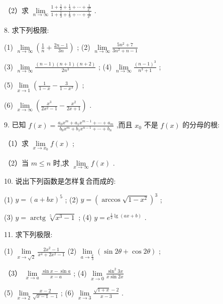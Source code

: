 \documentclass[lang=cn,newtx,10pt,scheme=chinese]{elegantbook}
\begin{document}
（2）求 \(\mathop{\lim }\limits_{{n \rightarrow \infty }}\frac{1 + \frac{1}{2} + \frac{1}{4} + \cdots + \frac{1}{{2}^{n}}}{1 + \frac{1}{3} + \frac{1}{9} + \cdots + \frac{1}{{3}^{n}}}\) .

8. 求下列极限:

(1) \(\mathop{\lim }\limits_{{n \rightarrow \infty }}\left( {\frac{1}{n} + \frac{{2n} - 1}{3n}}\right)\) ; (2) \(\mathop{\lim }\limits_{{n \rightarrow \infty }}\frac{5{n}^{2} + 7}{3{n}^{2} + n - 1}\)

(3) \(\mathop{\lim }\limits_{{n \rightarrow \infty }}\frac{\left( {n - 1}\right) \left( {n + 1}\right) \left( {n + 2}\right) }{2{n}^{3}}\) ; (4) \(\mathop{\lim }\limits_{{n \rightarrow \infty }}\frac{{\left( n - 1\right) }^{3}}{{n}^{3} + 1}\) ;

(5) \(\mathop{\lim }\limits_{{x \rightarrow 1}}\left( {\frac{1}{1 - x} - \frac{3}{1 - {x}^{3}}}\right)\) ;

(6) \(\mathop{\lim }\limits_{{x \rightarrow \infty }}\left( {\frac{{x}^{3}}{2{x}^{2} - 1} - \frac{{x}^{2}}{{2x} + 1}}\right)\) .

9. 已知 \(f\left( x\right) = \frac{{a}_{0}{x}^{m} + {a}_{1}{x}^{m - 1} + \cdots + {a}_{m}}{{b}_{0}{x}^{m} + {b}_{1}{x}^{n - 1} + \cdots + {b}_{n}}\) ,而且 \({x}_{0}\) 不是 \(f\left( x\right)\) 的分母的根:

（1）求 \(\mathop{\lim }\limits_{{x \rightarrow {x}_{0}}}f\left( x\right)\) ;

（2）当 \(m \leq n\) 时,求 \(\mathop{\lim }\limits_{{x \rightarrow \infty }}f\left( x\right)\) .

10. 说出下列函数是怎样复合而成的:

(1) \(y = {\left( a + bx\right) }^{5}\) ; (2) \(y = {\left( \arccos \sqrt{1 - {x}^{2}}\right) }^{3}\) ;

(3) \(y = \operatorname{arctg}\sqrt[5]{{x}^{3} - 1}\) ; (4) \(y = {e}^{\frac{1}{2}\lg \left( {{ax} + b}\right) }\) .

11. 求下列极限:

(1) \(\mathop{\lim }\limits_{{x \rightarrow \sqrt{2}}}\frac{2{x}^{2} - 1}{{x}^{4} + 2{x}^{2} - 1}\) (2) \(\mathop{\lim }\limits_{{a \rightarrow \frac{\pi }{3}}}\left( {\sin {2\theta } + \cos {2\theta }}\right)\) ;

（3） \(\mathop{\lim }\limits_{{x \rightarrow a}}\frac{\sin x - \sin a}{x - a}\) ; (4) \(\mathop{\lim }\limits_{{x \rightarrow 0}}\frac{{\sin }^{2}{3x}}{x\sin {2x}}\)

(5) \(\mathop{\lim }\limits_{{x \rightarrow 2}}\frac{x - 2}{\sqrt{x - 1} - 1}\) ; (6) \(\mathop{\lim }\limits_{{x \rightarrow 3}}\frac{\sqrt{1 + x} - 2}{x - 3}\) .
\end{document}

